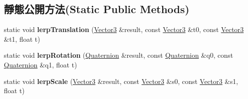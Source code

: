 \subsection*{靜態公開方法(Static Public Methods)}
\begin{DoxyCompactItemize}
\item 
static void {\bfseries lerp\+Translation} (\hyperlink{class_i_dream_sky_1_1_vector3}{Vector3} \&result, const \hyperlink{class_i_dream_sky_1_1_vector3}{Vector3} \&t0, const \hyperlink{class_i_dream_sky_1_1_vector3}{Vector3} \&t1, float t)\hypertarget{class_i_dream_sky_1_1_skeletal_animation_model_1_1_bone_animation_a92fcefe922176cff39b8e2011eedc336}{}\label{class_i_dream_sky_1_1_skeletal_animation_model_1_1_bone_animation_a92fcefe922176cff39b8e2011eedc336}

\item 
static void {\bfseries lerp\+Rotation} (\hyperlink{class_i_dream_sky_1_1_quaternion}{Quaternion} \&result, const \hyperlink{class_i_dream_sky_1_1_quaternion}{Quaternion} \&q0, const \hyperlink{class_i_dream_sky_1_1_quaternion}{Quaternion} \&q1, float t)\hypertarget{class_i_dream_sky_1_1_skeletal_animation_model_1_1_bone_animation_a5456b09c64fe05a42a448d3d9dbc1d77}{}\label{class_i_dream_sky_1_1_skeletal_animation_model_1_1_bone_animation_a5456b09c64fe05a42a448d3d9dbc1d77}

\item 
static void {\bfseries lerp\+Scale} (\hyperlink{class_i_dream_sky_1_1_vector3}{Vector3} \&result, const \hyperlink{class_i_dream_sky_1_1_vector3}{Vector3} \&s0, const \hyperlink{class_i_dream_sky_1_1_vector3}{Vector3} \&s1, float t)\hypertarget{class_i_dream_sky_1_1_skeletal_animation_model_1_1_bone_animation_afd669d9f2f81237cd312d5277e5277bd}{}\label{class_i_dream_sky_1_1_skeletal_animation_model_1_1_bone_animation_afd669d9f2f81237cd312d5277e5277bd}

\end{DoxyCompactItemize}
